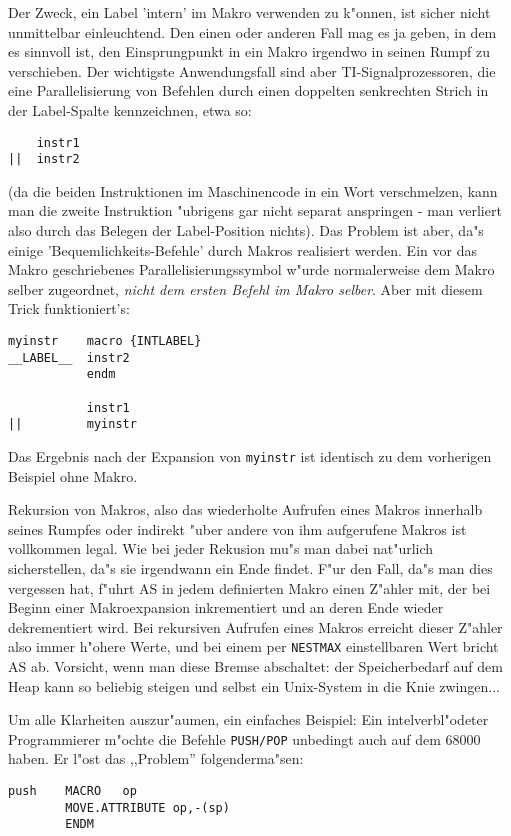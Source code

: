 \documentclass[12pt,a4paper,twoside]{report}
\newcommand{\tty}[1]{{\tt #1}}
\begin{document}
{Der Zweck, ein Label 'intern' im Makro verwenden zu k"onnen, ist sicher
nicht unmittelbar einleuchtend.  Den einen oder anderen Fall mag es ja
geben, in dem es sinnvoll ist, den Einsprungpunkt in ein Makro irgendwo
in seinen Rumpf zu verschieben.  Der wichtigste Anwendungsfall sind aber
TI-Signalprozessoren, die eine Parallelisierung von Befehlen durch einen
doppelten senkrechten Strich in der Label-Spalte kennzeichnen, etwa so:
\begin{verbatim}
    instr1
||  instr2
\end{verbatim}
(da die beiden Instruktionen im Maschinencode in ein Wort verschmelzen,
kann man die zweite Instruktion "ubrigens gar nicht separat anspringen - 
man verliert also durch das Belegen der Label-Position nichts).  Das
Problem ist aber, da"s einige 'Bequemlichkeits-Befehle' durch Makros
realisiert werden.  Ein vor das Makro geschriebenes
Parallelisierungssymbol w"urde normalerweise dem Makro selber zugeordnet,
{\it nicht dem ersten Befehl im Makro selber}.  Aber mit diesem Trick
funktioniert's:
\begin{verbatim}
myinstr    macro {INTLABEL}
__LABEL__  instr2
           endm

           instr1
||         myinstr
\end{verbatim}
Das Ergebnis nach der Expansion von {\tt myinstr} ist identisch zu dem
vorherigen Beispiel ohne Makro.

Rekursion von Makros, also das wiederholte Aufrufen eines Makros innerhalb
seines Rumpfes oder indirekt "uber andere von ihm aufgerufene Makros ist
vollkommen legal.  Wie bei jeder Rekusion mu"s man dabei nat"urlich
sicherstellen, da"s sie irgendwann ein Ende findet.  F"ur den Fall, da"s
man dies vergessen hat, f"uhrt AS in jedem definierten Makro einen Z"ahler
mit, der bei Beginn einer Makroexpansion inkrementiert und an deren Ende
wieder dekrementiert wird.  Bei rekursiven Aufrufen eines Makros erreicht
dieser Z"ahler also immer h"ohere Werte, und bei einem per {\tt NESTMAX}
einstellbaren Wert bricht AS ab.  Vorsicht, wenn man diese Bremse
abschaltet: der Speicherbedarf auf dem Heap kann so beliebig steigen und
selbst ein Unix-System in die Knie zwingen...
\par
Um alle Klarheiten auszur"aumen, ein einfaches Beispiel:
Ein intelverbl"odeter Programmierer m"ochte die Befehle \tty{PUSH/POP}
unbedingt auch auf dem 68000 haben.  Er l"ost das ,,Problem''
folgenderma"sen:
\begin{verbatim}
push    MACRO   op
        MOVE.ATTRIBUTE op,-(sp)
        ENDM


\end{verbatim}}
\end{document}
